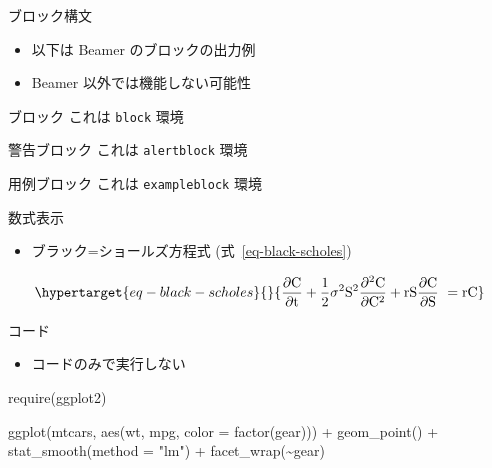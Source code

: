 \documentclass[
  ignorenonframetext,
]{beamer}
\newenvironment{Shaded}{\begin{snugshade}}{\end{snugshade}}
\newcommand{\AttributeTok}[1]{\textcolor[rgb]{0.00,0.48,0.65}{#1}}
\newcommand{\FunctionTok}[1]{\textcolor[rgb]{0.28,0.35,0.67}{#1}}
\newcommand{\NormalTok}[1]{\textcolor[rgb]{0.00,0.48,0.65}{#1}}
\newcommand{\SpecialCharTok}[1]{\textcolor[rgb]{0.37,0.37,0.37}{#1}}
\newcommand{\StringTok}[1]{\textcolor[rgb]{0.13,0.47,0.30}{#1}}
\providecommand{\tightlist}{%
  \setlength{\itemsep}{0pt}\setlength{\parskip}{0pt}}
\begin{document}
\begin{frame}[fragile]{ブロック構文}
\protect\hypertarget{ux30d6ux30edux30c3ux30afux69cbux6587}{}
\begin{itemize}
\tightlist
\item
  以下は Beamer のブロックの出力例
\item
  Beamer 以外では機能しない可能性
\end{itemize}

\begin{alertblock}{ブロック}
これは \texttt{block} 環境

\end{alertblock}

\begin{alertblock}{警告ブロック}
これは \texttt{alertblock} 環境

\end{alertblock}

\begin{exampleblock}{用例ブロック}
これは \texttt{exampleblock} 環境

\end{exampleblock}
\end{frame}

\begin{frame}{数式表示}
\protect\hypertarget{ux6570ux5f0fux8868ux793a}{}
\begin{itemize}
\tightlist
\item
  ブラック=ショールズ方程式 (式~\ref{eq-black-scholes})
\end{itemize}

\begin{equation}\protect\hypertarget{eq-black-scholes}{}{
\frac{\partial \mathrm C}{ \partial \mathrm t } + \frac{1}{2}\sigma^{2} \mathrm S^{2}
\frac{\partial^{2} \mathrm C}{\partial \mathrm C^2}
  + \mathrm r \mathrm S \frac{\partial \mathrm C}{\partial \mathrm S}\ =
  \mathrm r \mathrm C 
}\label{eq-black-scholes}\end{equation}
\end{frame}

\begin{frame}[fragile]{コード}
\protect\hypertarget{ux30b3ux30fcux30c9}{}
\begin{itemize}
\tightlist
\item
  コードのみで実行しない
\end{itemize}

\begin{Shaded}
\begin{Highlighting}[]
\FunctionTok{require}\NormalTok{(ggplot2)}

\FunctionTok{ggplot}\NormalTok{(mtcars, }\FunctionTok{aes}\NormalTok{(wt, mpg, }\AttributeTok{color =} \FunctionTok{factor}\NormalTok{(gear))) }\SpecialCharTok{+}
  \FunctionTok{geom\_point}\NormalTok{() }\SpecialCharTok{+}
  \FunctionTok{stat\_smooth}\NormalTok{(}\AttributeTok{method =} \StringTok{"lm"}\NormalTok{) }\SpecialCharTok{+}
  \FunctionTok{facet\_wrap}\NormalTok{(}\SpecialCharTok{\textasciitilde{}}\NormalTok{gear)}
\end{Highlighting}
\end{Shaded}
\end{frame}
\end{document}
